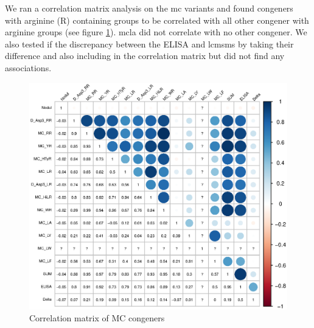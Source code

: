 We ran a correlation matrix analysis on the \gls{mc} variants and found congeners with arginine (R) containing groups to be correlated with all other congener with arginine groups (see figure \ref{fig:congenermatrix}). \gls{mcla} did not correlate with no other congener. We also tested if the discrepancy between the ELISA and \gls{lcmsms} by taking their difference and also including in the correlation matrix but did not find any associations. 



\begin{figure}[p]
	\includegraphics[width=\textwidth]{figures/congener_matrix}
	\caption{Correlation matrix of MC congeners}
	\label{fig:congenermatrix}
\end{figure}







